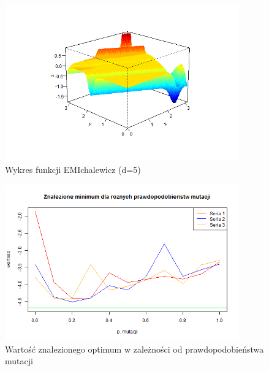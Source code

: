 \documentclass[11pt, a4paper]{article}
\begin{document}
\newpage
\begin{figure}[H]
	\begin{center}
		\includegraphics[width=0.9\textwidth]{./assets/EMichalewicz1.png} %
		\caption{Wykres funkcji EMIchalewicz (d=5)}
		\label{fig:emichalewicz1}
	\end{center}
\end{figure}

\begin{figure}[H]
	\begin{center}
		\includegraphics[width=0.9\textwidth]{./assets/EMichalewicz2.png} %
		\caption{Wartość znalezionego optimum w zależności od prawdopodobieństwa mutacji}
		\label{fig:emichalewicz2}
	\end{center}
\end{figure}
\end{document}
